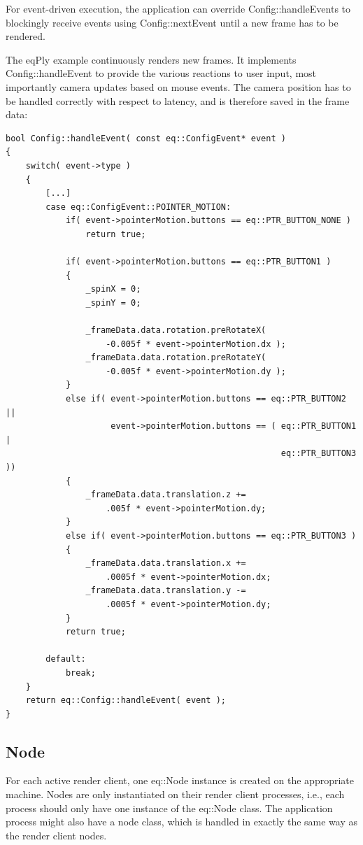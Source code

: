 \documentclass[10pt,a4]{scrartcl}
\begin{document}
For event-driven execution, the application can override
\textsf{Config::handleEvents} to blockingly receive events using
\textsf{Config::nextEvent} until a new frame has to be rendered.

The \textsf{eqPly} example continuously renders new frames. It
implements \textsf{Config::hand\-le\-Event} to provide the various reactions
to user input, most importantly camera updates based on mouse
events. The camera position has to be handled correctly with respect to
latency, and is therefore saved in the frame data:

{\footnotesize\begin{lstlisting}
bool Config::handleEvent( const eq::ConfigEvent* event )
{
    switch( event->type )
    {
        [...]
        case eq::ConfigEvent::POINTER_MOTION:
            if( event->pointerMotion.buttons == eq::PTR_BUTTON_NONE )
                return true;

            if( event->pointerMotion.buttons == eq::PTR_BUTTON1 )
            {
                _spinX = 0;
                _spinY = 0;

                _frameData.data.rotation.preRotateX( 
                    -0.005f * event->pointerMotion.dx );
                _frameData.data.rotation.preRotateY(
                    -0.005f * event->pointerMotion.dy );
            }
            else if( event->pointerMotion.buttons == eq::PTR_BUTTON2 ||
                     event->pointerMotion.buttons == ( eq::PTR_BUTTON1 |
                                                       eq::PTR_BUTTON3 ))
            {
                _frameData.data.translation.z +=
                    .005f * event->pointerMotion.dy;
            }
            else if( event->pointerMotion.buttons == eq::PTR_BUTTON3 )
            {
                _frameData.data.translation.x += 
                    .0005f * event->pointerMotion.dx;
                _frameData.data.translation.y -= 
                    .0005f * event->pointerMotion.dy;
            }
            return true;

        default:
            break;
    }
    return eq::Config::handleEvent( event );
}
\end{lstlisting}}


\subsection{Node}

For each active render client, one \textsf{eq::Node} instance is
created on the appropriate machine. Nodes are only instantiated on their
render client processes, i.e., each process should only have one
instance of the \textsf{eq::Node} class. The application process might
also have a node class, which is handled in exactly the same way as the
render client nodes.
\end{document}
